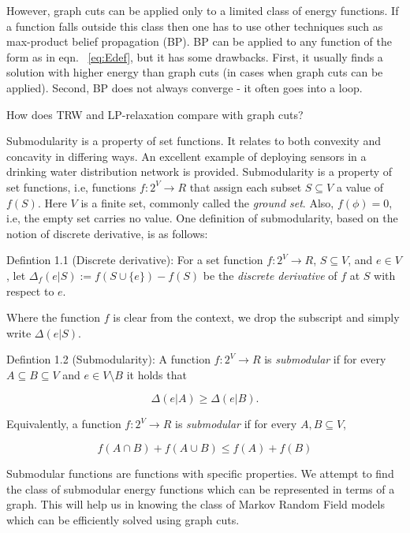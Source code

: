 \documentclass{article}
\begin{document}
However, graph cuts can be applied only to a limited class of energy functions. If a function falls outside this class then one has to use other techniques such as max-product belief propagation (BP). BP can be applied to any function of the form as in eqn. ~\ref{eq:Edef}, but it has some drawbacks. First, it usually finds a solution with higher energy than graph cuts (in cases when graph cuts can be applied). Second, BP does not always converge - it often goes into a loop.

How does TRW and LP-relaxation compare with graph cuts?

\cite{krause2012submodular}

Submodularity is a property of set functions. It relates to both convexity and concavity in differing ways. 
An excellent example of deploying sensors in a drinking water distribution network is provided. 
Submodularity is a property of set functions, i.e, functions $f : 2^V \to R$ that assign each subset $S \subseteq V$ a value of $f(S)$. Here $V$ is a finite set, commonly called the \emph{ground set}. Also, $f(\phi) = 0$, i.e, the empty set carries no value. One definition of submodularity, based on the notion of discrete derivative, is as follows:

Defintion 1.1 (Discrete derivative): For a set function  $f : 2^V \to R$, $S \subseteq V$, and $e \in V$, let $\Delta_f(e|S) := f(S \cup \{e\}) - f(S)$ be the \emph{discrete derivative} of $f$ at $S$ with respect to $e$.

Where the function $f$ is clear from the context, we drop the subscript and simply write $\Delta(e|S)$.

Defintion 1.2 (Submodularity): A function $f : 2^V \to R$ is \emph{submodular} if for every $A \subseteq B \subseteq V$ and $e \in V \setminus B$ it holds that

\begin{equation}
	\Delta(e|A) \geq \Delta(e|B).
\end{equation}

Equivalently, a function $f : 2^V \to R$ is \emph{submodular} if for every $A, B \subseteq V$,

\begin{equation}
	f(A \cap B) + f(A \cup B) \leq f(A) + f(B)
\end{equation}


Submodular functions are functions with specific properties. We attempt to find the class of submodular energy functions which can be represented in terms of a graph. This will help us in knowing the class of Markov Random Field models which can be efficiently solved using graph cuts.



\end{document}
